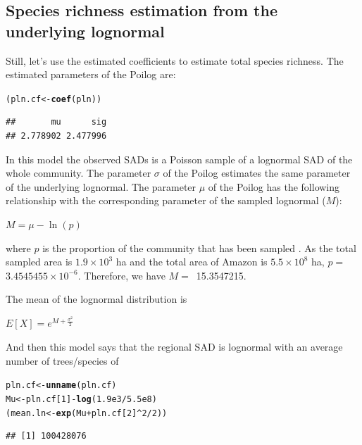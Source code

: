 \documentclass[12pt, A4]{article}\usepackage[]{graphicx}\usepackage[]{color}
\makeatletter
\newcommand{\hlnum}[1]{\textcolor[rgb]{0.686,0.059,0.569}{#1}}%
\newcommand{\hlopt}[1]{\textcolor[rgb]{0,0,0}{#1}}%
\newcommand{\hlstd}[1]{\textcolor[rgb]{0.345,0.345,0.345}{#1}}%
\newcommand{\hlkwb}[1]{\textcolor[rgb]{0.69,0.353,0.396}{#1}}%
\newcommand{\hlkwd}[1]{\textcolor[rgb]{0.737,0.353,0.396}{\textbf{#1}}}%
\newenvironment{kframe}{%
 \def\at@end@of@kframe{}%
 \ifinner\ifhmode%
  \def\at@end@of@kframe{\end{minipage}}%
  \begin{minipage}{\columnwidth}%
 \fi\fi%
 \def\FrameCommand##1{\hskip\@totalleftmargin \hskip-\fboxsep
 \colorbox{shadecolor}{##1}\hskip-\fboxsep
     \hskip-\linewidth \hskip-\@totalleftmargin \hskip\columnwidth}%
 \MakeFramed {\advance\hsize-\width
   \@totalleftmargin\z@ \linewidth\hsize
   \@setminipage}}%
 {\par\unskip\endMakeFramed%
 \at@end@of@kframe}
\newenvironment{knitrout}{}{} %
\makeatother
\begin{document}
\subsection*{Species richness estimation from the underlying lognormal}


Still, let's use the estimated coefficients to estimate total species richness.
The estimated parameters of the Poilog are:

\begin{knitrout}
\color{fgcolor}\begin{kframe}
\begin{alltt}
\hlstd{(pln.cf} \hlkwb{<-} \hlkwd{coef}\hlstd{(pln))}
\end{alltt}
\begin{verbatim}
##       mu      sig 
## 2.778902 2.477996
\end{verbatim}
\end{kframe}
\end{knitrout}

In this model the observed SADs is a Poisson sample of a lognormal SAD of the whole community.
The parameter $\sigma$ of the Poilog estimates the same parameter of the underlying lognormal.
The parameter $\mu$ of the Poilog has the following relationship with the corresponding parameter
of the sampled lognormal ($M$):

$ M = \mu - \ln(p)$

where $p$ is the proportion of the community that has been sampled
\citep{Bulmer1974,Saether2013}.
As the total sampled area is $1.9 \times 10^3$ ha and the 
total area of Amazon is $5.5 \times 10^8$ ha, $p=$~\ensuremath{3.4545455\times 10^{-6}}.
Therefore, we have $M=$~15.3547215.

The mean of the lognormal distribution is 

$E[X] = e^{M + \frac{\sigma^2}{2}}$

And then this model says that the regional SAD is lognormal
with an average number of trees/species of

 
\begin{knitrout}
\color{fgcolor}\begin{kframe}
\begin{alltt}
\hlstd{pln.cf} \hlkwb{<-} \hlkwd{unname}\hlstd{(pln.cf)}
\hlstd{Mu} \hlkwb{<-} \hlstd{pln.cf[}\hlnum{1}\hlstd{]}\hlopt{-}\hlkwd{log}\hlstd{(}\hlnum{1.9e3}\hlopt{/}\hlnum{5.5e8}\hlstd{)}
\hlstd{(mean.ln} \hlkwb{<-} \hlkwd{exp}\hlstd{(Mu} \hlopt{+} \hlstd{pln.cf[}\hlnum{2}\hlstd{]}\hlopt{^}\hlnum{2}\hlopt{/}\hlnum{2}\hlstd{))}
\end{alltt}
\begin{verbatim}
## [1] 100428076
\end{verbatim}
\end{kframe}
\end{knitrout}
\end{document}
